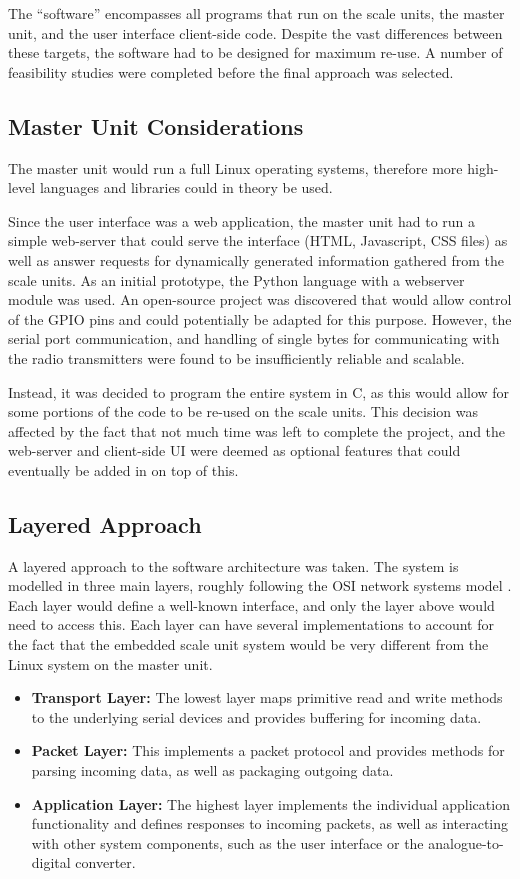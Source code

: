 The ``software'' encompasses all programs that run on the scale units, the master unit, and the user interface client-side code. Despite the vast differences between these targets, the software had to be designed for maximum re-use. A number of feasibility studies were completed before the final approach was selected.

\subsection{Master Unit Considerations}
The master unit would run a full Linux operating systems, therefore more high-level languages and libraries could in theory be used.

Since the user interface was a web application, the master unit had to run a simple web-server that could serve the interface (HTML, Javascript, CSS files) as well as answer requests for dynamically generated information gathered from the scale units. As an initial prototype, the Python language with a webserver module \cite{bottle-py} was used. An open-source project \cite{webiopi} was discovered that would allow control of the GPIO pins and could potentially be adapted for this purpose. However, the serial port communication, and handling of single bytes for communicating with the radio transmitters were found to be insufficiently reliable and scalable.

Instead, it was decided to program the entire system in C, as this would allow for some portions of the code to be re-used on the scale units. This decision was affected by the fact that not much time was left to complete the project, and the web-server and client-side UI were deemed as optional features that could eventually be added in on top of this.

\subsection{Layered Approach}
A layered approach to the software architecture was taken. The system is modelled in three main layers, roughly following the OSI network systems model \cite{osi-model}. Each layer would define a well-known interface, and only the layer above would need to access this. Each layer can have several implementations to account for the fact that the embedded scale unit system would be very different from the Linux system on the master unit.

\begin{itemize}
	\item \textbf{Transport Layer:} The lowest layer maps primitive read and write methods to the underlying serial devices and provides buffering for incoming data.
	\item \textbf{Packet Layer:} This implements a packet protocol and provides methods for parsing incoming data, as well as packaging outgoing data.
	\item \textbf{Application Layer:} The highest layer implements the individual application functionality and defines responses to incoming packets, as well as interacting with other system components, such as the user interface or the analogue-to-digital converter.
\end{itemize}

